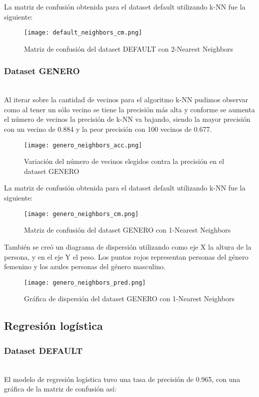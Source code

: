 \documentclass[sigconf,authorversion,nonacm]{acmart}
\begin{document}
La matriz de confusión obtenida para el dataset default utilizando k-NN fue la siguiente:

\begin{figure}[H]
  \centering
  \texttt{[image: default\_neighbors\_cm.png]}
  \caption{Matriz de confusión del dataset DEFAULT con 2-Nearest Neighbors}
\end{figure}

\subsubsection{Dataset GENERO}\hfill\\
Al iterar sobre la cantidad de vecinos para el algoritmo k-NN pudimos observar como al tener un sólo vecino se tiene la precisión más alta y conforme se aumenta el número de vecinos la precisión de k-NN va bajando, siendo la mayor precisión con un vecino de 0.884 y la peor precisión con 100 vecinos de 0.677.

\begin{figure}[H]
  \centering
  \texttt{[image: genero\_neighbors\_acc.png]}
  \caption{Variación del número de vecinos elegidos contra la precisión en el dataset GENERO}
\end{figure}

La matriz de confusión obtenida para el dataset default utilizando k-NN fue la siguiente:

\begin{figure}[H]
  \centering
  \texttt{[image: genero\_neighbors\_cm.png]}
  \caption{Matriz de confusión del dataset GENERO con 1-Nearest Neighbors}
\end{figure}

También se creó un diagrama de dispersión utilizando como eje X la altura de la persona, y en el eje Y el peso. Los puntos rojos representan personas del género femenino y los azules personas del género masculino.

\begin{figure}[H]
  \centering
  \texttt{[image: genero\_neighbors\_pred.png]}
  \caption{Gráfica de dispersión del dataset GENERO con 1-Nearest Neighbors}
\end{figure}

\subsection{Regresión logística}

\subsubsection{Dataset DEFAULT}\hfill\\
El modelo de regresión logística tuvo una tasa de precisión de 0.965, con una gráfica de la matriz de confusión así:
\end{document}

